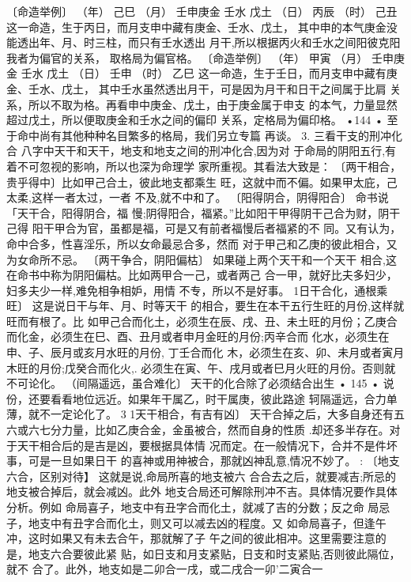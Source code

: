 〔命造举例〕
（年） 己巳
（月） 壬申庚金 壬水 戊土
（日） 丙辰
（时） 己丑
这一命造，生于丙日，而月支申中藏有庚金、壬水、戊土，
其中申的本气庚金没能透出年、月、时三柱，而只有壬水透出
月干,所以根据丙火和壬水之间阳彼克阳我者为偏官的关系，
取格局为偏官格。
〔命造举例〕
（年） 甲寅
（月） 壬申庚金 壬水 戊土
（日） 壬申
（时） 乙巳
这一命造，生于壬日，而月支申中藏有庚金、壬水、戊土，
其中壬水虽然透出月干，可是因为月干和日干之间属于比肩
关系，所以不取为格。再看申中庚金、戊土，由于庚金属于申支
的本气，力量显然超过戊土，所以便取庚金和壬水之间的偏印
关系，定格局为偏印格。
•144 •
至于命中尚有其他种种名目繁多的格局，我们另立专篇
再谈。
3. 三看干支的刑冲化合
八字中天干和天干，地支和地支之间的刑冲化合,因为对
于命局的阴阳五行,有着不可忽视的影响，所以也深为命理学
家所重视。其看法大致是：
〔两干相合，贵乎得中〕比如甲己合土，彼此地支都乘生
旺，这就中而不偏。如果甲太庇，己太柔,这样一者太过，一者
不及,就不中和了。
〔阳得阴合，阴得阳合〕 命书说「天干合，阳得阴合，福
慢;阴得阳合，福紧。”比如阳干甲得阴干己合为财，阴干己得
阳干甲合为官，虽都是福，可是又有前者福慢后者福紧的不
同。又有认为，命中合多，性喜淫乐，所以女命最忌合多，然而
对于甲己和乙庚的彼此相合，又为女命所不忌。
〔两干争合，阴阳偏枯〕 如果碰上两个天干和一个天干
相合,这在命书中称为阴阳偏枯。比如两甲合一己，或者两己
合一甲，就好比夫多妇少，妇多夫少一样,难免相争相妒，用情
不专，所以不是好事。
1日干合化，通根乘旺〕 这是说日干与年、月、时等天干
的相合，要生在本干五行生旺的月份,这样就旺而有根了。比
如甲己合而化土，必须生在辰、戌、丑、未土旺的月份；乙庚合
而化金，必须生在巳、酉、丑月或者申月金旺的月份;丙辛合而
化水，必须生在申、子、辰月或亥月水旺的月份, 丁壬合而化
木，必须生在亥、卯、未月或者寅月木旺的月份;戊癸合而化火,.
必须生在寅、午、戌月或者巳月火旺的月份。否则就不可论化。
（间隔遥远，虽合难化〕 天干的化合除了必须结合出生
• 145 •
说份，还要看看地位远近。如果年干属乙，时干属庚，彼此路途
轲隔遥远，合力单薄，就不一定论化了。
3 1天干相合，有吉有凶〕 天干合掉之后，大多自身还有五
六或六七分力量，比如乙庚合金，金虽被合，然而自身的性质
.却还多半存在。对于天干相合后的是吉是凶，要根据具体情
况而定。在一般情况下，合并不是件坏事，可是一旦如果日干
的喜神或用神被合，那就凶神乱意,情况不妙了。
: 〔地支六合，区别对待】 这就是说,命局所喜的地支被六
合合去之后，就要减吉;所忌的地支被合掉后，就会减凶。此外
地支合局还可解除刑冲不吉。具体情况要作具体分析。例如
命局喜子，地支中有丑字合而化土，就减了吉的分数；反之命
局忌子，地支中有丑字合而化土，则又可以减去凶的程度。又
如命局喜子，但逢午冲，这时如果又有未去合午，那就解了子
午之间的彼此相冲。这里需要注意的是，地支六合要彼此紧
贴，如日支和月支紧贴，日支和时支紧贴,否则彼此隔位，就不
合了。此外，地支如是二卯合一戌，或二戌合一卯'二寅合一
